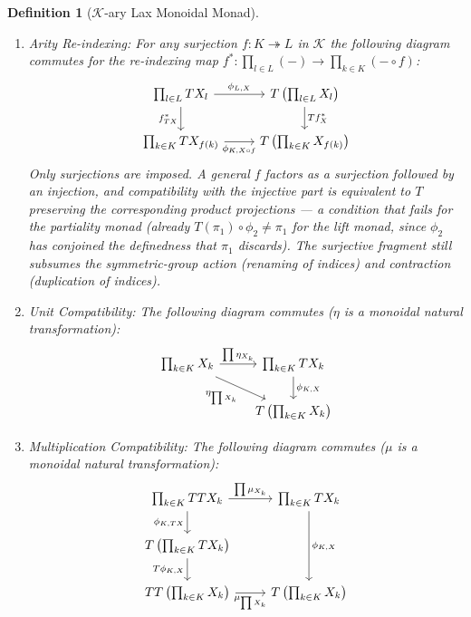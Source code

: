 \documentclass{article}
\newtheorem{definition}{Definition}
\begin{document}
\begin{definition}[$\mathcal{K}$-ary Lax Monoidal Monad]
\begin{enumerate}
    \item \emph{Arity Re-indexing:} For any \emph{surjection} $f: K \twoheadrightarrow L$ in $\mathcal{K}$ the following diagram commutes for the re-indexing map $f^* : \prod_{l \in L} (-) \to \prod_{k \in K} (- \circ f)$:
    \[
    \begin{tikzcd}
        \prod_{l \in L} TX_l \arrow[r, "\phi_{L, X}"] \arrow[d, "f^*_{TX}"'] & T\left(\prod_{l \in L} X_l\right) \arrow[d, "Tf^*_X"] \\
        \prod_{k \in K} TX_{f(k)} \arrow[r, "\phi_{K, X \circ f}"'] & T\left(\prod_{k \in K} X_{f(k)}\right)
    \end{tikzcd}
    \]
    Only surjections are imposed. A general $f$ factors as a surjection followed by an injection, and compatibility with the injective part is equivalent to $T$ preserving the corresponding product projections --- a condition that fails for the partiality monad (already $T(\pi_1) \circ \phi_2 \neq \pi_1$ for the lift monad, since $\phi_2$ has conjoined the definedness that $\pi_1$ discards). The surjective fragment still subsumes the symmetric-group action (renaming of indices) and contraction (duplication of indices).
    
    \item \emph{Unit Compatibility:} The following diagram commutes ($\eta$ is a monoidal natural transformation):
    \[\begin{tikzcd}
	{\prod_{k \in K} X_k} & {\prod_{k \in K} TX_k} \\
	& {T\left(\prod_{k \in K} X_k\right)}
	\arrow["{\prod \eta_{X_k}}", from=1-1, to=1-2]
	\arrow["{\eta_{\prod X_k}}"', from=1-1, to=2-2]
	\arrow["{\phi_{K, X}}", from=1-2, to=2-2]
    \end{tikzcd}\]
    
    \item \emph{Multiplication Compatibility:} The following diagram commutes ($\mu$ is a monoidal natural transformation):
    \[\begin{tikzcd}
	{\prod_{k \in K} TTX_k} & {\prod_{k \in K} TX_k} \\
	{T\left(\prod_{k \in K} TX_k\right)} \\
	{TT\left(\prod_{k \in K} X_k\right)} & {T\left(\prod_{k \in K} X_k\right)}
	\arrow["{\prod \mu_{X_k}}", from=1-1, to=1-2]
	\arrow["{\phi_{K, TX}}"', from=1-1, to=2-1]
	\arrow["{\phi_{K, X}}", from=1-2, to=3-2]
	\arrow["{T\phi_{K, X}}"', from=2-1, to=3-1]
	\arrow["{\mu_{\prod X_k}}"', from=3-1, to=3-2]
    \end{tikzcd}\]
\end{enumerate}
\end{definition}
\end{document}
